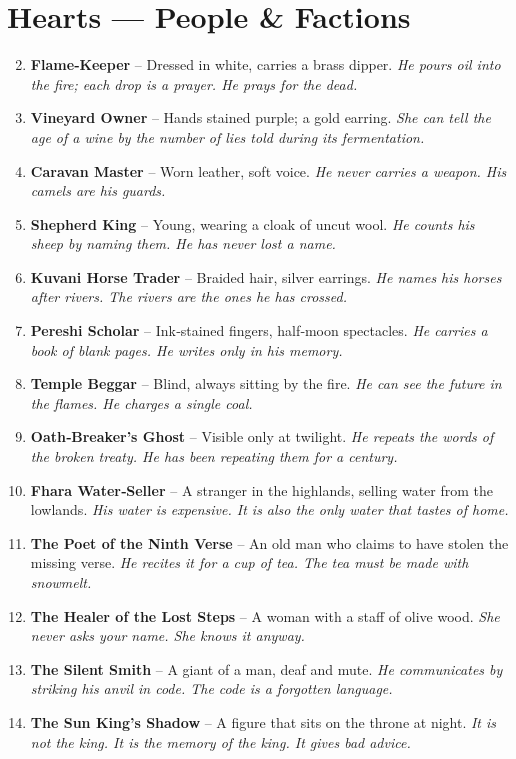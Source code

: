 \documentclass[11pt]{book}
\begin{document}
\section*{Hearts — People \& Factions}
\begin{enumerate}
\setcounter{enumi}{1}
\item \textbf{Flame‑Keeper} – Dressed in white, carries a brass dipper. \textit{He pours oil into the fire; each drop is a prayer. He prays for the dead.}
\item \textbf{Vineyard Owner} – Hands stained purple; a gold earring. \textit{She can tell the age of a wine by the number of lies told during its fermentation.}
\item \textbf{Caravan Master} – Worn leather, soft voice. \textit{He never carries a weapon. His camels are his guards.}
\item \textbf{Shepherd King} – Young, wearing a cloak of uncut wool. \textit{He counts his sheep by naming them. He has never lost a name.}
\item \textbf{Kuvani Horse Trader} – Braided hair, silver earrings. \textit{He names his horses after rivers. The rivers are the ones he has crossed.}
\item \textbf{Pereshi Scholar} – Ink‑stained fingers, half‑moon spectacles. \textit{He carries a book of blank pages. He writes only in his memory.}
\item \textbf{Temple Beggar} – Blind, always sitting by the fire. \textit{He can see the future in the flames. He charges a single coal.}
\item \textbf{Oath‑Breaker’s Ghost} – Visible only at twilight. \textit{He repeats the words of the broken treaty. He has been repeating them for a century.}
\item \textbf{Fhara Water‑Seller} – A stranger in the highlands, selling water from the lowlands. \textit{His water is expensive. It is also the only water that tastes of home.}
\item[J] \textbf{The Poet of the Ninth Verse} – An old man who claims to have stolen the missing verse. \textit{He recites it for a cup of tea. The tea must be made with snowmelt.}
\item[Q] \textbf{The Healer of the Lost Steps} – A woman with a staff of olive wood. \textit{She never asks your name. She knows it anyway.}
\item[K] \textbf{The Silent Smith} – A giant of a man, deaf and mute. \textit{He communicates by striking his anvil in code. The code is a forgotten language.}
\item[A] \textbf{The Sun King’s Shadow} – A figure that sits on the throne at night. \textit{It is not the king. It is the memory of the king. It gives bad advice.}
\end{enumerate}
\end{document}
